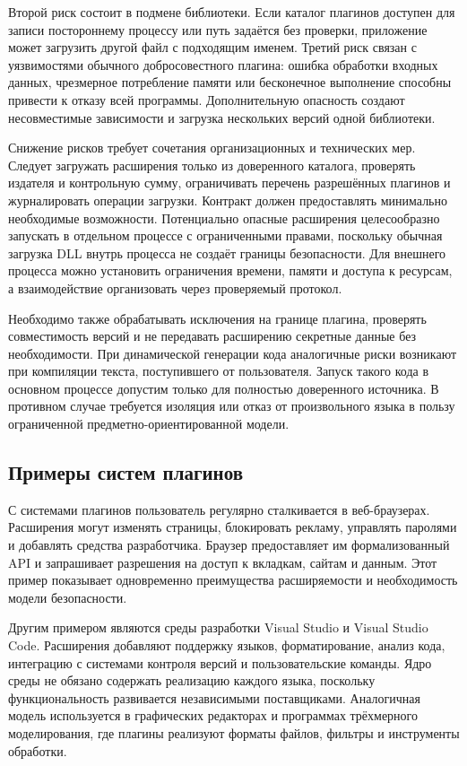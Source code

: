 Второй риск состоит в подмене библиотеки. Если каталог плагинов доступен для записи постороннему процессу или путь задаётся без проверки, приложение может загрузить другой файл с подходящим именем. Третий риск связан с уязвимостями обычного добросовестного плагина: ошибка обработки входных данных, чрезмерное потребление памяти или бесконечное выполнение способны привести к отказу всей программы. Дополнительную опасность создают несовместимые зависимости и загрузка нескольких версий одной библиотеки.

Снижение рисков требует сочетания организационных и технических мер. Следует загружать расширения только из доверенного каталога, проверять издателя и контрольную сумму, ограничивать перечень разрешённых плагинов и журналировать операции загрузки. Контракт должен предоставлять минимально необходимые возможности. Потенциально опасные расширения целесообразно запускать в отдельном процессе с ограниченными правами, поскольку обычная загрузка DLL внутрь процесса не создаёт границы безопасности. Для внешнего процесса можно установить ограничения времени, памяти и доступа к ресурсам, а взаимодействие организовать через проверяемый протокол.

Необходимо также обрабатывать исключения на границе плагина, проверять совместимость версий и не передавать расширению секретные данные без необходимости. При динамической генерации кода аналогичные риски возникают при компиляции текста, поступившего от пользователя. Запуск такого кода в основном процессе допустим только для полностью доверенного источника. В противном случае требуется изоляция или отказ от произвольного языка в пользу ограниченной предметно-ориентированной модели.

\subsection{Примеры систем плагинов}

С системами плагинов пользователь регулярно сталкивается в веб-браузерах. Расширения могут изменять страницы, блокировать рекламу, управлять паролями и добавлять средства разработчика. Браузер предоставляет им формализованный API и запрашивает разрешения на доступ к вкладкам, сайтам и данным. Этот пример показывает одновременно преимущества расширяемости и необходимость модели безопасности.

Другим примером являются среды разработки Visual Studio и Visual Studio Code. Расширения добавляют поддержку языков, форматирование, анализ кода, интеграцию с системами контроля версий и пользовательские команды. Ядро среды не обязано содержать реализацию каждого языка, поскольку функциональность развивается независимыми поставщиками. Аналогичная модель используется в графических редакторах и программах трёхмерного моделирования, где плагины реализуют форматы файлов, фильтры и инструменты обработки.

